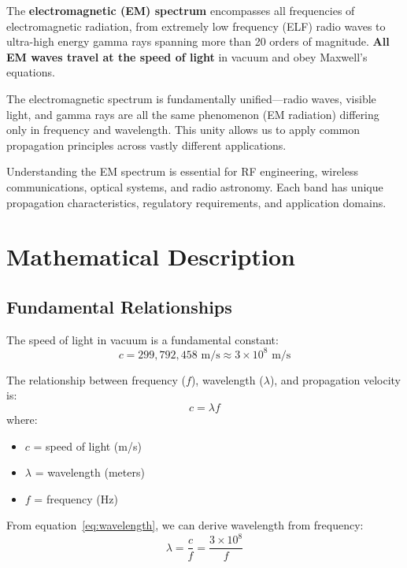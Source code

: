 The \textbf{electromagnetic (EM) spectrum} encompasses all frequencies of electromagnetic radiation, from extremely low frequency (ELF) radio waves to ultra-high energy gamma rays spanning more than 20 orders of magnitude. \textbf{All EM waves travel at the speed of light} in vacuum and obey Maxwell's equations.

\begin{keyconcept}
The electromagnetic spectrum is fundamentally unified---radio waves, visible light, and gamma rays are all the same phenomenon (EM radiation) differing only in frequency and wavelength. This unity allows us to apply common propagation principles across vastly different applications.
\end{keyconcept}

Understanding the EM spectrum is essential for RF engineering, wireless communications, optical systems, and radio astronomy. Each band has unique propagation characteristics, regulatory requirements, and application domains.

\section{Mathematical Description}

\subsection{Fundamental Relationships}

The speed of light in vacuum is a fundamental constant:
\begin{equation}
c = 299{,}792{,}458 \text{ m/s} \approx 3 \times 10^8 \text{ m/s}
\end{equation}

The relationship between frequency ($f$), wavelength ($\lambda$), and propagation velocity is:
\begin{equation}
c = \lambda f
\label{eq:wavelength}
\end{equation}
where:
\begin{itemize}
\item $c$ = speed of light (m/s)
\item $\lambda$ = wavelength (meters)
\item $f$ = frequency (Hz)
\end{itemize}

From equation~\ref{eq:wavelength}, we can derive wavelength from frequency:
\begin{equation}
\lambda = \frac{c}{f} = \frac{3 \times 10^8}{f}
\end{equation}


